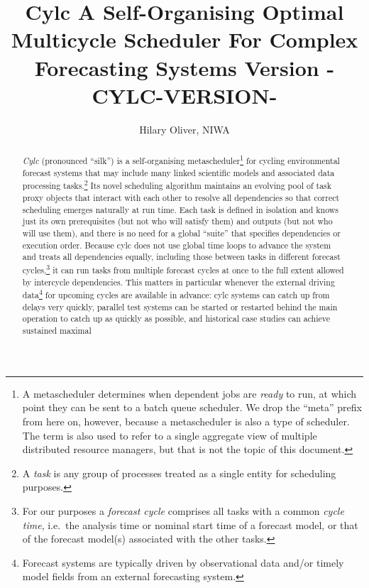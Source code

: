 \documentclass[11pt,a4paper]{article}
\title{Cylc \linebreak A Self-Organising Optimal Multicycle Scheduler \linebreak For Complex Forecasting Systems \linebreak Version -CYLC-VERSION-}
\author{Hilary Oliver, NIWA}
\begin{document}
\maketitle

\pagebreak
\tableofcontents
\pagebreak

\begin{abstract}

    {\em Cylc} (pronounced ``silk'') is a self-organising
    metascheduler\footnote{A metascheduler determines when dependent
    jobs are {\em ready} to run, at which point they can be sent to a
    batch queue scheduler. We drop the ``meta'' prefix from here on,
    however, because a metascheduler is also a type of scheduler. The
    term is also used to refer to a single aggregate view of multiple
    distributed resource managers, but that is not the topic of this
    document.} for cycling environmental forecast systems that may include
    many linked scientific models and associated data processing
    tasks.\footnote{A {\em task} is any group of processes treated as a
    single entity for scheduling purposes.} Its novel scheduling
    algorithm maintains an evolving pool of task proxy objects that
    interact with each other to resolve all dependencies so that correct
    scheduling emerges naturally at run time.  Each task is defined in
    isolation and knows just its own prerequisites (but not who will
    satisfy them) and outputs (but not who will use them), and there is
    no need for a global ``suite'' that specifies dependencies or
    execution order. Because cylc does not use global time loops to
    advance the system and treats all dependencies equally, including
    those between tasks in different forecast cycles,\footnote{For our
    purposes a {\em forecast cycle} comprises all tasks with a common
    {\em cycle time}, i.e.\ the analysis time or nominal start time of a
    forecast model, or that of the forecast model(s) associated with the
    other tasks.} it can run tasks from multiple forecast cycles at once
    to the full extent allowed by intercycle dependencies. This matters
    in particular whenever the external driving data\footnote{Forecast
    systems are typically driven by observational data and/or timely
    model fields from an external forecasting system.} for upcoming
    cycles are available in advance: cylc systems can catch up from
    delays very quickly, parallel test systems can be started or
    restarted behind the main operation to catch up as quickly as
    possible, and historical case studies can achieve sustained maximal

\end{abstract}
\end{document}
